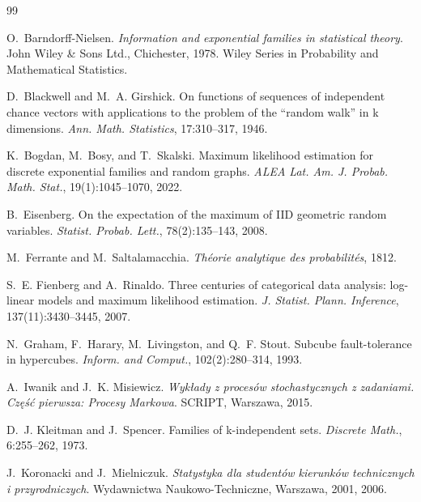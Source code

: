%
%
\begin{thebibliography}{99}

O.~Barndorff-Nielsen.
\newblock \emph{Information and exponential families in statistical theory}.
\newblock John Wiley \& Sons Ltd., Chichester, 1978. Wiley Series in Probability and Mathematical Statistics.

D.~Blackwell and M.~A. Girshick.
\newblock On functions of sequences of independent chance vectors with applications to the problem of the “random walk” in k dimensions.
\newblock \emph{Ann. Math. Statistics}, 17:310--317, 1946.

K.~Bogdan, M.~Bosy, and T.~Skalski.
\newblock Maximum likelihood estimation for discrete exponential families and random graphs.
\newblock \emph{ALEA Lat. Am. J. Probab. Math. Stat.}, 19(1):1045--1070, 2022.

B.~Eisenberg.
\newblock On the expectation of the maximum of IID geometric random variables.
\newblock \emph{Statist. Probab. Lett.}, 78(2):135--143, 2008.

M.~Ferrante and M.~Saltalamacchia.
\newblock \emph{Théorie analytique des probabilités}, 1812.

S.~E. Fienberg and A.~Rinaldo.
\newblock Three centuries of categorical data analysis: log-linear models and maximum likelihood estimation.
\newblock \emph{J. Statist. Plann. Inference}, 137(11):3430--3445, 2007.

N.~Graham, F.~Harary, M.~Livingston, and Q.~F. Stout.
\newblock Subcube fault-tolerance in hypercubes.
\newblock \emph{Inform. and Comput.}, 102(2):280--314, 1993.

A.~Iwanik and J.~K. Misiewicz.
\newblock \emph{Wykłady z procesów stochastycznych z zadaniami. Część pierwsza: Procesy Markowa}.
\newblock SCRIPT, Warszawa, 2015.

D.~J. Kleitman and J.~Spencer.
\newblock Families of k-independent sets.
\newblock \emph{Discrete Math.}, 6:255--262, 1973.

J.~Koronacki and J.~Mielniczuk.
\newblock \emph{Statystyka dla studentów kierunków technicznych i przyrodniczych}.
\newblock Wydawnictwa Naukowo-Techniczne, Warszawa, 2001, 2006.


\end{thebibliography}

